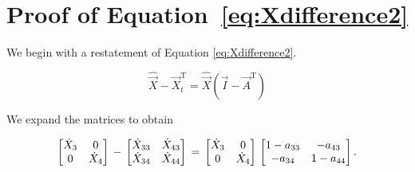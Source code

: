 %
%
%

\appendix
\chapter{Proof of Equation~\ref{eq:Xdifference2}}
\label{app:B} %



We begin with a restatement of Equation \ref{eq:Xdifference2}.

\begin{equation} \label{eq:Xdifference2Proof-1}
	\hat{\vec{X}} - \vec{X}_t^\mathrm{T} = \hat{\vec{X}}(\vec{I} - \vec{A}^\mathrm{T})
\end{equation}

\noindent We expand the matrices to obtain

\begin{equation} \label{eq:Xdifference2Proof-2}
\begin{bmatrix} 	\dot{X}_{3} & 0	\\
				0 & \dot{X}_{4}	\\
\end{bmatrix} \\
 - \\
\begin{bmatrix} 	\dot{X}_{33} & \dot{X}_{43}	\\
				\dot{X}_{34} & \dot{X}_{44}	\\
\end{bmatrix} \\
= \\
\begin{bmatrix} 	\dot{X}_{3} & 0	\\
				0 & \dot{X}_{4}	\\
\end{bmatrix} \\
\begin{bmatrix} 	1 - a_{33} & -a_{43}	\\
				-a_{34} & 1 - a_{44}	\\
\end{bmatrix}.
\end{equation}

